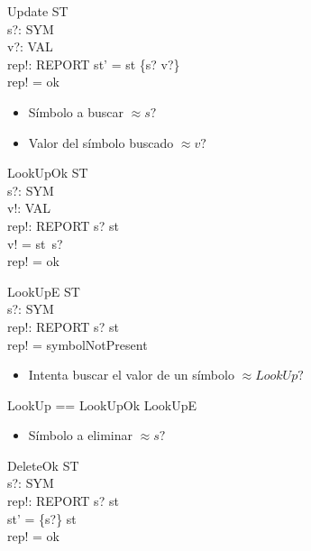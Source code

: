 \begin{schema}{Update}
\Delta ST \\
s?: SYM \\
v?: VAL \\
rep!: REPORT
\where
st' = st \oplus \{s? \mapsto v?\} \\
rep! = ok
\end{schema}

\begin{itemize}
  \item Símbolo a buscar $\approx s?$ \\
  \item Valor del símbolo buscado  $\approx v?$ 
\end{itemize}

\begin{schema}{LookUpOk}
\Xi ST \\
s?: SYM \\
v!: VAL \\
rep!: REPORT
\where
s? \in \dom st \\
v! = st~s? \\
rep! = ok
\end{schema}

\begin{schema}{LookUpE}
\Xi ST \\
s?: SYM \\
rep!: REPORT
\where
s? \notin \dom st \\
rep! = symbolNotPresent
\end{schema}

\begin{itemize}
  \item Intenta buscar el valor de un símbolo $\approx LookUp?$ 
\end{itemize}

\begin{zed}
LookUp == LookUpOk \lor LookUpE
\end{zed}

\begin{itemize}
  \item Símbolo a eliminar $\approx s?$ 
\end{itemize}

\begin{schema}{DeleteOk}
\Delta ST \\
s?: SYM \\
rep!: REPORT
\where
s? \in \dom st \\
st' = \{s?\} \ndres st \\
rep! = ok
\end{schema}

